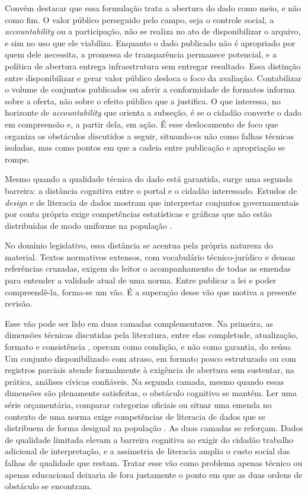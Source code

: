 \documentclass[brazilian]{sbc2025}
\begin{document}
Convém destacar que essa formulação trata a abertura do dado como meio, e não como fim. O valor público perseguido pelo campo, seja o controle social, a \emph{accountability} ou a participação, não se realiza no ato de disponibilizar o arquivo, e sim no uso que ele viabiliza. Enquanto o dado publicado não é apropriado por quem dele necessita, a promessa de transparência permanece potencial, e a política de abertura entrega infraestrutura sem entregar resultado. Essa distinção entre disponibilizar e gerar valor público desloca o foco da avaliação. Contabilizar o volume de conjuntos publicados ou aferir a conformidade de formatos informa sobre a oferta, não sobre o efeito público que a justifica. O que interessa, no horizonte de \emph{accountability} que orienta a subseção, é se o cidadão converte o dado em compreensão e, a partir dela, em ação. É esse deslocamento de foco que organiza os obstáculos discutidos a seguir, situando-os não como falhas técnicas isoladas, mas como pontos em que a cadeia entre publicação e apropriação se rompe.

Mesmo quando a qualidade técnica do dado está garantida, surge uma segunda barreira: a distância cognitiva entre o portal e o cidadão interessado. Estudos de \emph{design} e de literacia de dados mostram que interpretar conjuntos governamentais por conta própria exige competências estatísticas e gráficas que não estão distribuídas de modo uniforme na população \citep{Hornung2015,Lee2017,Brito2024}.

No domínio legislativo, essa distância se acentua pela própria natureza do material. Textos normativos extensos, com vocabulário técnico-jurídico e densas referências cruzadas, exigem do leitor o acompanhamento de todas as emendas para entender a validade atual de uma norma. Entre publicar a lei e poder compreendê-la, forma-se um vão. É a superação desse vão que motiva a presente revisão.

Esse vão pode ser lido em duas camadas complementares. Na primeira, as dimensões técnicas discutidas pela literatura, entre elas completude, atualização, formato e consistência \citep{ZuiderwijkJanssen2014,Vetro2016}, operam como condição, e não como garantia, do reúso. Um conjunto disponibilizado com atraso, em formato pouco estruturado ou com registros parciais atende formalmente à exigência de abertura sem sustentar, na prática, análises cívicas confiáveis. Na segunda camada, mesmo quando essas dimensões são plenamente satisfeitas, o obstáculo cognitivo se mantém. Ler uma série orçamentária, comparar categorias oficiais ou situar uma emenda no contexto de uma norma exige competências de literacia de dados que se distribuem de forma desigual na população \citep{Hornung2015,Lee2017}. As duas camadas se reforçam. Dados de qualidade limitada elevam a barreira cognitiva ao exigir do cidadão trabalho adicional de interpretação, e a assimetria de literacia amplia o custo social das falhas de qualidade que restam. Tratar esse vão como problema apenas técnico ou apenas educacional deixaria de fora justamente o ponto em que as duas ordens de obstáculo se encontram.
\end{document}
